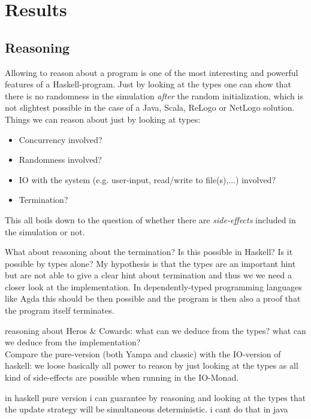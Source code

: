 \section{Results}

\graphicspath{{./fig/}}	%

\subsection{Reasoning}
Allowing to reason about a program is one of the most interesting and powerful features of a Haskell-program. Just by looking at the types one can show that there is no randomness in the simulation \textit{after} the random initialization, which is not slightest possible in the case of a Java, Scala, ReLogo or NetLogo solution. Things we can reason about just by looking at types:

\begin{itemize}
\item Concurrency involved?
\item Randomness involved?
\item IO with the system (e.g. user-input, read/write to file(s),...) involved?
\item Termination?
\end{itemize}

This all boils down to the question of whether there are \textit{side-effects} included in the simulation or not.

What about reasoning about the termination? Is this possible in Haskell? Is it possible by types alone? My hypothesis is that the types are an important hint but are not able to give a clear hint about termination and thus we we need a closer look at the implementation. In dependently-typed programming languages like Agda this should be then possible and the program is then also a 
proof that the program itself terminates.

reasoning about Heros \& Cowards: what can we deduce from the types? what can we deduce from the implementation?\\

Compare the pure-version (both Yampa and classic) with the IO-version of haskell: we loose basically all power to reason by just looking at the types as all kind of side-effects are possible when running in the IO-Monad.

in haskell pure version i can guarantee by reasoning and looking at the types that the update strategy will be simultaneous deterministic. i cant do that in java

